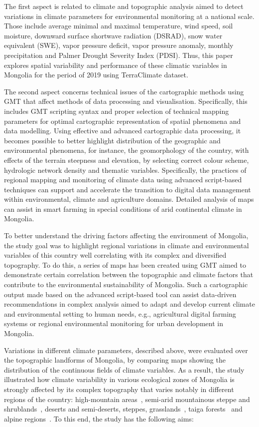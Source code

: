 \documentclass[geosciences,article,accept,pdftex,oneauthor]{Definitions/mdpi}
\begin{document}
The first aspect is related to climate and topographic analysis aimed to detect variations in climate parameters for environmental monitoring at a national scale. Those include average minimal and maximal temperature, wind speed, soil moisture, downward surface shortwave radiation (DSRAD), snow water equivalent (SWE), vapor pressure deficit, vapor pressure anomaly, monthly precipitation and Palmer Drought Severity Index (PDSI). Thus, this paper explores spatial variability and performance of these climatic variables in Mongolia for the period of 2019 using TerraClimate dataset.

The second aspect concerns technical issues of the cartographic methods using GMT that affect methods of data processing and visualisation. Specifically, this includes GMT scripting syntax and proper selection of technical mapping parameters for optimal cartographic representation of spatial phenomena and data modelling. Using effective and advanced cartographic data processing, it becomes possible to better highlight distribution of the geographic and environmental phenomena, for instance, the geomorphology of the country, with effects of the terrain steepness and elevation, by selecting correct colour scheme, hydrologic network density and thematic variables. {Specifically, the practices of regional mapping and monitoring of climate data using advanced script-based techniques can support and accelerate the transition to digital data management within environmental, climate and agriculture domains. Detailed analysis of maps can assist in smart farming in special conditions of arid continental climate in Mongolia.}

To better understand the driving factors affecting the environment of Mongolia, the study goal was to highlight regional variations in climate and environmental variables of this country well correlating with its complex and diversified topography. To do this, a series of maps has been created using GMT aimed to demonstrate certain correlation between the topographic and climate factors that contribute to the environmental sustainability of Mongolia. {Such a cartographic output made based on the advanced script-based tool can assist data-driven recommendations in complex analysis aimed to adapt and develop current climate and environmental setting to human needs, e.g., agricultural digital farming systems or regional environmental monitoring for urban development in Mongolia.}


Variations in different climate parameters, described above, were evaluated over the topographic landforms of Mongolia, by comparing maps showing the distribution of the continuous fields of climate variables. As a result, the study illustrated how climate variability in various ecological zones of Mongolia is strongly affected by its complex topography that varies notably in different regions of the country: high-mountain areas~\mbox{\cite{UNKELBACH2021100073,UNKELBACH2021107076}}, semi-arid mountainous steppe and shrublands~\cite{Minderlein}, deserts and semi-deserts, steppes, grasslands~\cite{WANG2022108783,LIU2021108567}, taiga forests~\cite{GRADEL201724,DULAMSUREN2005376} and alpine regions~\cite{KLINGE2022108113}. To this end, the study has the following aims:     
\end{document}
